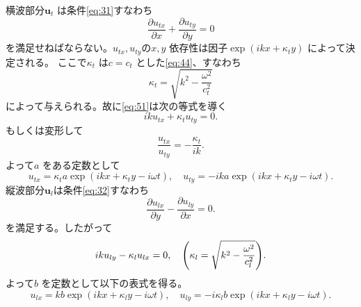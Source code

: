 \documentclass[dvipdfmx]{jsreport}
\numberwithin{equation}{chapter}
\numberwithin{table}{chapter}
\begin{document}
横波部分$\bm{u}_t$ は条件\eqref{eq:31}すなわち
\begin{equation}
\label{eq:51}
	\frac{\partial u_{tx}}{\partial x} +\frac{\partial u_{ty}}{\partial y} =0
\end{equation}
を満足せねばならない。$u_{tx},u_{ty}$の$x,y$ 依存性は因子$\exp (ikx+\kappa_ty)$ によって決定される。
ここで$\kappa_t$ は$c=c_t$ とした\eqref{eq:44}、すなわち
\begin{equation}
\label{eq:52}
	\kappa_t=\sqrt{k^2-\frac{\omega^2}{c_t^2}} 
\end{equation}
によって与えられる。故に\eqref{eq:51}は次の等式を導く
\begin{equation}
\label{eq:53}
	iku_{tx}+\kappa_tu_{ty}=0
.\end{equation}
もしくは変形して
\begin{equation}
\label{eq:54}
	\frac{u_{tx}}{u_{ty}}=-\frac{\kappa_t}{ik}
.\end{equation}
よって$a$ をある定数として
\begin{equation}
\label{eq:55}
	u_{tx}=\kappa_ta\exp (ikx+\kappa_t y-i\omega t),\quad u_{ty}=-ika\exp (ikx + \kappa_t y -i\omega t)
.\end{equation}
縦波部分$\bm{u}_{l}$は条件\eqref{eq:32}すなわち
\begin{equation}
\label{eq:56}
\frac{\partial u_{lx}}{\partial y} -\frac{\partial u_{ly}}{\partial x} =0
.\end{equation}
を満足する。したがって
\begin{equation}
\label{eq:57}
	iku_{ly}-\kappa_lu_{lx}=0,\quad \qty(\kappa_l=\sqrt{k^2-\frac{\omega^2}{c_l^2}} )
.\end{equation}
よって$b$ を定数として以下の表式を得る。
\begin{equation}
\label{eq:58}
	u_{lx}=kb\exp (ikx+\kappa_ly-i\omega t),\quad u_{ly}=-i\kappa_lb\exp (ikx +\kappa_l y -i\omega t)
.\end{equation}
\end{document}
